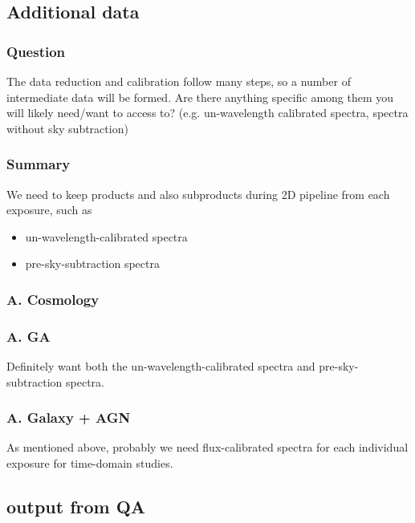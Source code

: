 \documentclass[a4paper,notitlepage]{article}
\begin{document}
\subsection{Additional data}

\subsubsection{Question}
The data reduction and calibration follow many steps, so a
      number of intermediate data will be formed. Are there anything
      specific among them you will likely need/want to access to?
      (e.g. un-wavelength calibrated spectra, spectra without sky subtraction) 

\subsubsection{Summary}

We need to keep products and also subproducts during 2D pipeline from each 
exposure, such as 
\begin{itemize}
  \item un-wavelength-calibrated spectra
  \item pre-sky-subtraction spectra
\end{itemize}

\subsubsection{A. Cosmology}

\subsubsection{A. GA}
Definitely want both the un-wavelength-calibrated spectra and
pre-sky-subtraction spectra. 

\subsubsection{A. Galaxy + AGN}
As mentioned above, probably we need flux-calibrated spectra for 
each individual exposure for time-domain studies.


\renewcommand{\thesubsection}{Q.4.1-\alph{subsection}}
\setcounter{subsection}{0}
\subsection{output from QA}
\end{document}

